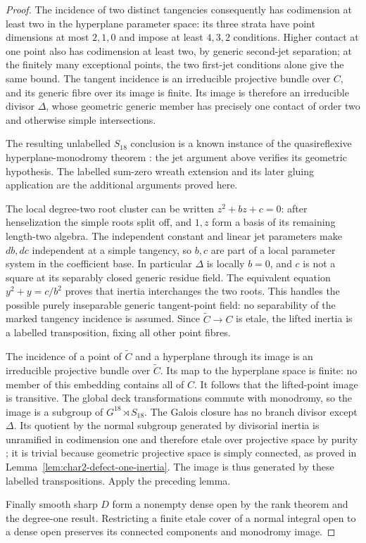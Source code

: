 \begin{proof}
The incidence of two distinct tangencies consequently has
codimension at least two in the hyperplane parameter space:
its three strata have point dimensions at most $2,1,0$ and
impose at least $4,3,2$ conditions. Higher contact at one
point also has codimension at least two, by generic second-jet
separation; at the finitely many exceptional points, the two
first-jet conditions alone give the same bound.
The tangent incidence is an irreducible projective
bundle over $C$, and its generic fibre over its image is finite.
Its image is therefore an irreducible divisor $\Delta$, whose
geometric generic member has precisely one contact of order
two and otherwise simple intersections.

The resulting unlabelled $S_{18}$ conclusion is a known
instance of the quasireflexive hyperplane-monodromy theorem
\cite[Theorem~2, p.~3; definition on p.~6; Proposition~3.1
and the proof of Theorem~2, pp.~7--8]{Entin2021}:
the jet argument above verifies its geometric hypothesis.
The labelled sum-zero wreath extension and its later gluing
application are the additional arguments proved here.

The local degree-two root cluster can be written
$z^2+bz+c=0$: after henselization the simple roots split off,
and $1,z$ form a basis of its remaining length-two algebra.
The independent constant and linear jet parameters make
$db,dc$ independent at a simple tangency, so $b,c$ are part
of a local parameter system in the coefficient base.
In particular $\Delta$ is locally $b=0$, and $c$ is not a
square at its separably closed generic residue field. The
equivalent equation $y^2+y=c/b^2$ proves that inertia interchanges
the two roots. This handles the possible purely inseparable
generic tangent-point field: no separability of the marked
tangency incidence is assumed. Since $\widetilde C\to C$ is
etale, the lifted inertia is a labelled transposition, fixing
all other point fibres.

The incidence of a point of $\widetilde C$ and a hyperplane
through its image is an irreducible projective bundle over
$\widetilde C$. Its map to the hyperplane space is finite:
no member of this embedding contains all of $C$.
It follows that the lifted-point image is transitive.
The global deck transformations commute with monodromy, so
the image is a subgroup of $G^{18}\rtimes S_{18}$.
The Galois closure has no branch divisor except $\Delta$.
Its quotient by the normal subgroup generated by divisorial
inertia is unramified in codimension one and therefore etale
over projective space by purity \cite{Stacks0BMB}; it is trivial
because geometric projective space is simply connected, as proved
in Lemma~\ref{lem:char2-defect-one-inertia}.
The image is thus generated
by these labelled transpositions. Apply the preceding lemma.

Finally smooth sharp $D$ form a nonempty dense open by the
rank theorem and the degree-one result. Restricting a finite
etale cover of a normal integral open to a dense open preserves
its connected components and monodromy image.
\end{proof}

